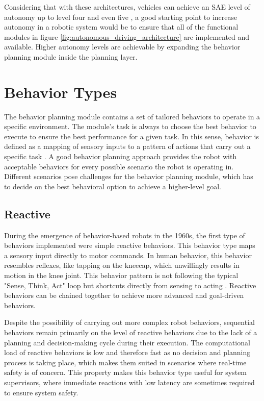 Considering that with these architectures, vehicles can achieve an SAE level of autonomy up to level four and even five \cite{bacha2008odin}, a good starting point to increase autonomy in a robotic system would be to ensure that all of the functional modules in figure \ref{fig:autonomous_driving_architecture} are implemented and available. Higher autonomy levels are achievable by expanding the behavior planning module inside the planning layer. 


\section{Behavior Types}
\label{sec:Behavior Types}

The behavior planning module contains a set of tailored behaviors to operate in a specific environment. The module's task is always to choose the best behavior to execute to ensure the best performance for a given task. In this sense, behavior is defined as a mapping of sensory inputs to a pattern of actions that carry out a specific task \cite{murphy2000}. A good behavior planning approach provides the robot with acceptable behaviors for every possible scenario the robot is operating in. Different scenarios pose challenges for the behavior planning module, which has to decide on the best behavioral option to achieve a higher-level goal. 

\subsection{Reactive}

During the emergence of behavior-based robots in the 1960s, the first type of behaviors implemented were simple reactive behaviors. This behavior type maps a sensory input directly to motor commands. In human behavior, this behavior resembles reflexes, like tapping on the kneecap, which unwillingly results in motion in the knee joint. This behavior pattern is not following the typical "Sense, Think, Act" loop but shortcuts directly from sensing to acting \cite{desilva2008}. Reactive behaviors can be chained together to achieve more advanced and goal-driven behaviors. 

Despite the possibility of carrying out more complex robot behaviors, sequential behaviors remain primarily on the level of reactive behaviors due to the lack of a planning and decision-making cycle during their execution. The computational load of reactive behaviors is low and therefore fast as no decision and planning process is taking place, which makes them suited in scenarios where real-time safety is of concern. This property makes this behavior type useful for system supervisors, where immediate reactions with low latency are sometimes required to ensure system safety. 

